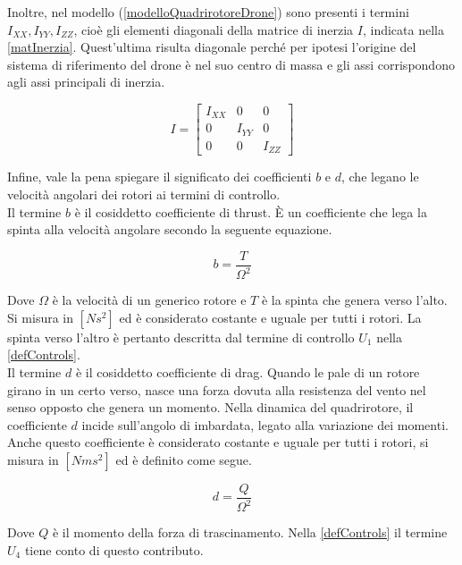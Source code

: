 Inoltre, nel modello (\ref{modelloQuadrirotoreDrone}) sono presenti i termini $I_{XX}, I_{YY}, I_{ZZ}$, cioè gli elementi diagonali della matrice di inerzia $I$, indicata nella \ref{matInerzia}. Quest'ultima risulta diagonale perché per ipotesi l'origine del sistema di riferimento del drone è nel suo centro di massa e gli assi corrispondono agli assi principali di inerzia.
 
\begin{equation}
I =
\begin{bmatrix}
I_{XX} & 0 & 0\\
0 & I_{YY} & 0\\
0 & 0 & I_{ZZ}
\end{bmatrix}
\label{matInerzia}
\end{equation}

Infine, vale la pena spiegare il significato dei coefficienti $b$ e $d$, che legano le velocità angolari dei rotori ai termini di controllo.\\

Il termine $b$ è il cosiddetto coefficiente di thrust. È un coefficiente che lega la spinta alla velocità angolare secondo la seguente equazione.

\begin{equation}
	b = \frac{T}{\Omega^2}
	\label{thrustCoeff}
\end{equation}

Dove $\Omega$ è la velocità di un generico rotore e $T$ è la spinta che genera verso l'alto. Si misura in $[N s^2]$ ed è considerato costante e uguale per tutti i rotori. La spinta verso l'altro è pertanto descritta dal termine di controllo $U_1$ nella \ref{defControls}.\\

Il termine $d$ è il cosiddetto coefficiente di drag. Quando le pale di un rotore girano in un certo verso, nasce una forza dovuta alla resistenza del vento nel senso opposto che genera un momento. Nella dinamica del quadrirotore, il coefficiente $d$ incide sull'angolo di imbardata, legato alla variazione dei momenti. Anche questo coefficiente è considerato costante e uguale per tutti i rotori, si misura in $[N m s^2]$ ed è definito come segue.

\begin{equation}
	d = \frac{Q}{\Omega^2}
\end{equation}

Dove $Q$ è il momento della forza di trascinamento. Nella \ref{defControls} il termine $U_4$ tiene conto di questo contributo.\\

